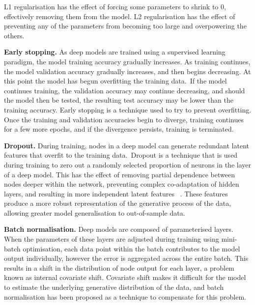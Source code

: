 \noindent L1 regularisation has the effect of forcing some parameters to shrink to 0, effectively removing them from the model. L2 regularisation has the effect of preventing any of the parameters from becoming too large and overpowering the others. \par

\noindent \textbf{Early stopping.} As deep models are trained using a supervised learning paradigm, the model training accuracy gradually increases. As training continues, the model validation accuracy gradually increases, and then begins decreasing. At this point the model has begun overfitting the training data.\ If the model continues training, the validation accuracy may continue decreasing, and should the model then be tested, the resulting test accuracy may be lower than the training accuracy. Early stopping is a technique used to try to prevent overfitting. Once the training and validation accuracies begin to diverge, training continues for a few more epochs, and if the divergence persists, training is terminated. \par

\noindent \textbf{Dropout.} During training, nodes in a deep model can generate redundant latent features that overfit to the training data.\ Dropout is a technique that is used during training to zero out a randomly selected proportion of neurons in the layer of a deep model. This has the effect of removing partial dependence between nodes deeper within the network, preventing complex co-adaptation of hidden layers, and resulting in more independent latent features \unskip ~\citep{hinton2012improving}. These features produce a more robust representation of the generative process of the data, allowing greater model generalisation to out-of-sample data. \par

\noindent \textbf{Batch normalisation.} Deep models are composed of parameterised layers. When the parameters of these layers are adjusted during training using mini-batch optimisation, each data point within the batch contributes to the model output individually, however the error is aggregated across the entire batch. This results in a shift in the distribution of node output for each layer, a problem known as internal covariate shift. Covariate shift makes it difficult for the model to estimate the underlying generative distribution of the data, and batch normalisation has been proposed as a technique to compensate for this problem. \par

